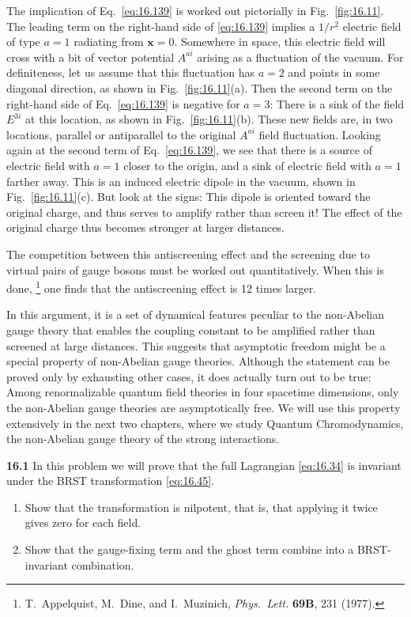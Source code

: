 The implication of Eq.~\eqref{eq:16.139} is worked out pictorially in
Fig.~\ref{fig:16.11}.  The leading term on the right-hand side of
\eqref{eq:16.139} implies a $1/r^2$ electric field of type $a = 1$ radiating
from $\mathbf{x} = 0$.  Somewhere in space, this electric field will cross
with a bit of vector potential $A^{ai}$ arising as a fluctuation of the
vacuum.  For definiteness, let us assume that this fluctuation has $a = 2$
and points in some diagonal direction, as shown in Fig.~\ref{fig:16.11}(a).
Then the second term on the right-hand side of Eq.~\eqref{eq:16.139} is
negative for $a = 3$: There is a sink of the field $E^{3i}$ at this location,
as shown in Fig.~\ref{fig:16.11}(b).  These new fields are, in two locations,
parallel or antiparallel to the original $A^{ai}$ field fluctuation.  Looking
again at the second term of Eq.~\eqref{eq:16.139}, we see that there is a
source of electric field with $a = 1$ closer to the origin, and a sink of
electric field with $a = 1$ farther away.  This is an induced electric dipole
in the vacuum, shown in Fig.~\ref{fig:16.11}(c).  But look at the signs: This
dipole is oriented toward the original charge, and thus serves to amplify
rather than screen it!  The effect of the original charge thus becomes
stronger at larger distances.

The competition between this antiscreening effect and the screening due to
virtual pairs of gauge bosons must be worked out quantitatively.  When this
is done,%
\footnote{T.~Appelquist, M.~Dine, and I.~Muzinich, \emph{Phys.\ Lett.}
\textbf{69B}, 231 (1977).} one finds that the antiscreening effect is 12
times larger.

In this argument, it is a set of dynamical features peculiar to the
non-Abelian gauge theory that enables the coupling constant to be amplified
rather than screened at large distances.  This suggests that asymptotic
freedom might be a special property of non-Abelian gauge theories.  Although
the statement can be proved only by exhausting other cases, it does actually
turn out to be true: Among renormalizable quantum field theories in four
spacetime dimensions, only the non-Abelian gauge theories are asymptotically
free.  We will use this property extensively in the next two chapters, where
we study Quantum Chromodynamics, the non-Abelian gauge theory of the strong
interactions.

\problems

\textbf{16.1} In this problem we will prove that the full Lagrangian
\eqref{eq:16.34} is invariant under the BRST transformation \eqref{eq:16.45}.
\begin{enumerate}[label=(\alph*)]
  \item Show that the transformation is nilpotent, that is, that applying it
    twice gives zero for each field.
  \item Show that the gauge-fixing term and the ghost term combine into a
    BRST-invariant combination.
\end{enumerate}

